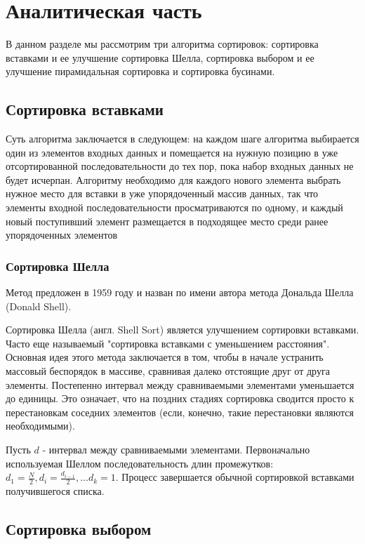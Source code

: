 \chapter{Аналитическая часть}
В данном разделе мы рассмотрим три алгоритма сортировок: сортировка вставками и ее улучшение сортировка Шелла, сортировка выбором и ее улучшение пирамидальная сортировка и сортировка бусинами.
\section{Сортировка вставками}

Суть алгоритма заключается в следующем: на каждом  шаге  алгоритма  выбирается один  из  элементов входных данных и  помещается  на нужную  позицию  в  уже  отсортированной последовательности до тех  пор,  пока  набор  входных  данных  не будет  исчерпан.  Алгоритму  необходимо  для  каждого нового  элемента  выбрать нужное место для вставки в уже упорядоченный массив данных, так что элементы  входной  последовательности просматриваются  по одному,  и каждый новый поступивший элемент размещается  в  подходящее  место среди  ранее  упорядоченных  элементов

\subsection{Сортировка Шелла}

Метод предложен в 1959 году и назван по имени автора метода Дональда Шелла (Donald Shell). 

Сортировка Шелла (англ. Shell Sort) является улучшением сортировки вставками. Часто еще называемый "сортировка вставками с уменьшением расстояния". Основная идея этого метода заключается в том, чтобы в начале устранить массовый беспорядок в массиве, сравнивая далеко
отстоящие друг от друга элементы. Постепенно интервал между сравниваемыми элементами уменьшается до единицы. Это означает, что на поздних стадиях сортировка сводится просто к перестановкам соседних элементов (если, конечно, такие перестановки являются необходимыми).

Пусть $d$ - интервал между сравниваемыми элементами. Первоначально используемая Шеллом последовательность длин промежутков: $d_1 = \frac{N}{2}, d_{i} = \frac{d_{i - 1}}{2}, … d_k = 1$. Процесс завершается обычной сортировкой вставками получившегося списка.

\section{Сортировка выбором}

